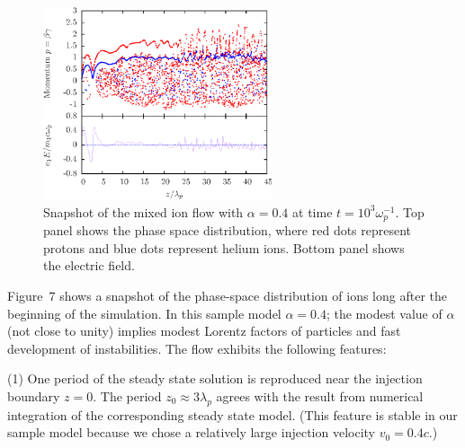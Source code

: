 
\begin{figure}[h]
\begin{center}
\includegraphics[width=0.6\textwidth]{pics/chap2/f7.eps}
\caption{Snapshot of the mixed ion flow with $\alpha=0.4$ at time
$t = 10^3\omega^{-1}_p$.
Top panel shows the phase space distribution, where red
dots represent protons and blue dots represent helium ions.
Bottom panel  shows the electric field.
}
\label{fig:2stream}
\end{center}
\end{figure}

Figure~7 shows a snapshot of the phase-space distribution of ions long after
the beginning of the simulation. In this sample model $\alpha=0.4$; the
modest value of $\alpha$ (not close to unity) implies modest Lorentz factors
of particles and fast development of instabilities.
%
The flow exhibits the following features:

\noindent
(1) One period of the steady state solution is reproduced near the injection
boundary $z=0$. The period $z_0\approx 3\lambda_p$ agrees with the result
from numerical integration of the corresponding steady state model.
(This feature is stable in our sample model
because we chose a relatively large injection velocity $v_0=0.4c$.)

